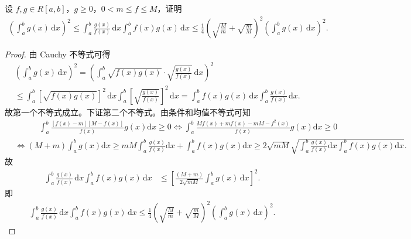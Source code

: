 \documentclass[../../main.tex]{subfiles}%
\begin{document}
\begin{proposition}[反向Cauchy不等式]\label{proposition:反向Cauchy不等式}
设 \(f,g \in R[a,b]\)，\(g \geqslant  0\)，\(0 < m \leqslant  f \leqslant  M\)，证明
\begin{align*}
\left( \int_a^b{g\left( x \right) \,\mathrm{d}x} \right) ^2\leqslant \int_a^b{\frac{g\left( x \right)}{f\left( x \right)}\,\mathrm{d}x\int_a^b{f\left( x \right) g\left( x \right) \,\mathrm{d}x\leqslant \frac{1}{4}\left( \sqrt{\frac{M}{m}}+\sqrt{\frac{m}{M}} \right) ^2\left( \int_a^b{g\left( x \right) \,\mathrm{d}x} \right) ^2}}.
\end{align*} 
\end{proposition}
\begin{proof}
由 Cauchy 不等式可得
\begin{align*}
&\left( \int_a^b g(x) \, \mathrm{d}x \right)^2 = \left( \int_a^b \sqrt{f(x) g(x)} \cdot \sqrt{\frac{g(x)}{f(x)}} \, \mathrm{d}x \right)^2 \\
&\leqslant \int_a^b \left[ \sqrt{f(x) g(x)} \right]^2 \, \mathrm{d}x \int_a^b \left[ \sqrt{\frac{g(x)}{f(x)}} \right]^2 \, \mathrm{d}x 
= \int_a^b f(x) g(x) \, \mathrm{d}x \int_a^b \frac{g(x)}{f(x)} \, \mathrm{d}x.
\end{align*}
故第一个不等式成立。下证第二个不等式。由条件和均值不等式可知
\begin{align*}
&\quad \quad \quad \int_a^b{\frac{\left[ f\left( x \right) -m \right] \left[ M-f\left( x \right) \right]}{f\left( x \right)}g\left( x \right) \mathrm{d}x}\geqslant 0\Longleftrightarrow \int_a^b{\frac{Mf\left( x \right) +mf\left( x \right) -mM-f^2\left( x \right)}{f\left( x \right)}g\left( x \right) \mathrm{d}x}\geqslant 0
\\
&\Longleftrightarrow \left( M+m \right) \int_a^b{g\left( x \right) \mathrm{d}x}\geqslant mM\int_a^b{\frac{g\left( x \right)}{f\left( x \right)}\mathrm{d}x}+\int_a^b{f\left( x \right) g\left( x \right) \mathrm{d}x}\geqslant 2\sqrt{mM}\sqrt{\int_a^b{\frac{g\left( x \right)}{f\left( x \right)}\mathrm{d}x}\int_a^b{f\left( x \right) g\left( x \right) \mathrm{d}x}}.
\end{align*}
故
\begin{align*}
\int_a^b \frac{g(x)}{f(x)} \, \mathrm{d}x \int_a^b f(x) g(x) \, \mathrm{d}x &\leqslant \left[ \frac{(M + m)}{2 \sqrt{m M}} \int_a^b g(x) \, \mathrm{d}x \right]^2.
\end{align*}
即
\begin{align*}
\int_a^b{\frac{g\left( x \right)}{f\left( x \right)}\,\mathrm{d}x\int_a^b{f\left( x \right) g\left( x \right) \,\mathrm{d}x\leqslant \frac{1}{4}\left( \sqrt{\frac{M}{m}}+\sqrt{\frac{m}{M}} \right) ^2\left( \int_a^b{g\left( x \right) \,\mathrm{d}x} \right) ^2}}.
\end{align*}
\end{proof}
\end{document}
